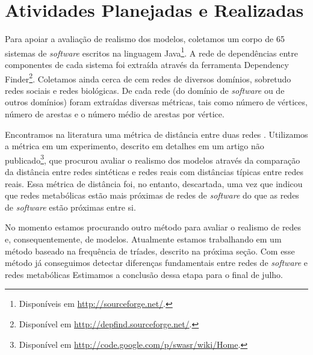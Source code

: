 \documentclass[12pt]{article}
\begin{document}
\section{Atividades Planejadas e Realizadas}


Para apoiar a avaliação de realismo dos modelos, coletamos um corpo de 65
sistemas de \emph{software} escritos na linguagem Java\footnote{Disponíveis em
\url{http://sourceforge.net/}.}. A rede de dependências entre componentes de
cada sistema foi extraída através da ferramenta Dependency
Finder\footnote{Disponível em \url{http://depfind.sourceforge.net/}.}.
Coletamos ainda cerca de cem redes de diversos domínios, sobretudo redes
sociais e redes biológicas. De cada rede (do domínio de \emph{software} ou de
outros domínios) foram extraídas diversas métricas, tais como número de
vértices, número de arestas e o número médio de arestas por vértice.

Encontramos na literatura uma métrica de distância entre duas redes
\cite{Andrade2008}.  Utilizamos a métrica em um experimento, descrito em
detalhes em um artigo não publicado\footnote{Disponível em
\url{http://code.google.com/p/swasr/wiki/Home}.}, que procurou avaliar o
realismo dos modelos através da comparação da distância entre redes sintéticas
e redes reais com distâncias típicas entre redes reais. Essa métrica de
distância foi, no entanto, descartada, uma vez que indicou que redes
metabólicas \cite{Jeong2000} estão mais próximas de redes de \emph{software} do
que as redes de \emph{software} estão próximas entre si.

No momento estamos procurando outro método para avaliar o realismo de redes e,
consequentemente, de modelos. 
Atualmente estamos trabalhando em um método baseado na frequência de tríades,
descrito na próxima seção. Com esse método já conseguimos detectar diferenças
fundamentais entre redes de \emph{software} e redes metabólicas Estimamos a
conclusão dessa etapa para o final de julho.
\end{document}
